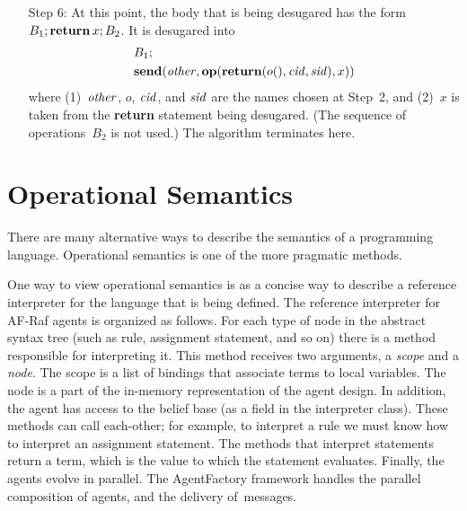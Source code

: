 \documentclass[a4paper,12pt,oneside,fleqn]{book} %
\begin{document}
{\begin{itemize}
\begin{align}
\begin{aligned}
&\{ \\
&\quad -{\bf Message}(a,{\bf op}({\bf return}(o'(),i,{\it sid}), t)); \\
&\quad -{\bf Continue}(o'(\bar v)); \\
&\quad B_2 \\
&\}
\end{aligned}
\label{eq:cont-rule}
\end{align}
  Here, $t$~is taken from the operation invocation being desugared.  The
  execution proceeds to Step~4, in order to desugar the body~$B_2$ of the
  rule~\eqref{eq:cont-rule}.
\item[Step 6:]
  At this point, the body that is being desugared has the form $B_1;{\bf
  return}\,x;B_2$. It is desugared into
\begin{align}
\begin{aligned}
&B_1; \\
&{\bf send}({\it other}, {\bf op}({\bf return}(o(), {\it cid}, {\it sid}), x))
\end{aligned}
\end{align}
  where (1)~$\it other$, $o$, $\it cid$, and $\it sid$ are the names chosen
  at Step~2, and (2)~$x$ is taken from the {\bf return} statement being
  desugared. (The sequence of operations~$B_2$ is not used.) The algorithm
  terminates here.
\end{itemize}

\section{Operational Semantics}\label{sec:opsem} %

There are many alternative ways to describe the semantics of a programming
language. Operational semantics is one of the more pragmatic methods.

One way to view operational semantics is as a concise way to describe a
reference interpreter for the language that is being defined. The reference
interpreter for AF-Raf agents is organized as follows. For each type of
node in the abstract syntax tree (such as rule, assignment statement, and
so on) there is a method responsible for interpreting it. This method
receives two arguments, a \emph{scope} and a \emph{node}. The scope is a
list of bindings that associate terms to local variables. The node is a
part of the in-memory representation of the agent design. In addition, the
agent has access to the belief base (as a field in the interpreter class).
These methods can call each-other; for example, to interpret a rule we must
know how to interpret an assignment statement. The methods that interpret
statements return a term, which is the value to which the statement
evaluates. Finally, the agents evolve in parallel. The AgentFactory
framework handles the parallel composition of agents, and the delivery
of~messages.

}
\end{document}
